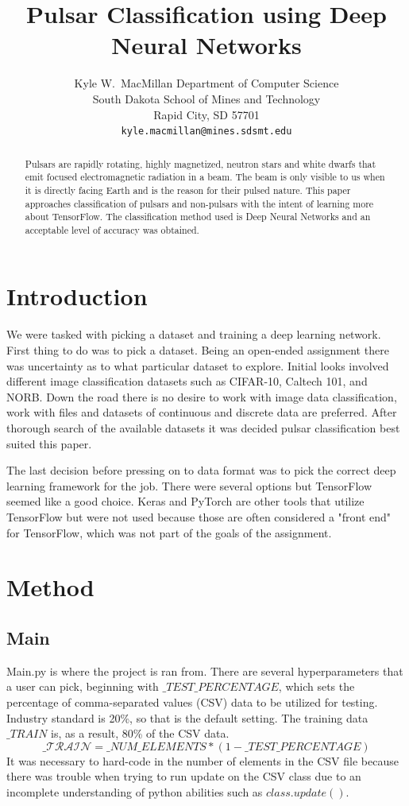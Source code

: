 \documentclass{article}
\title{Pulsar Classification using Deep Neural Networks}
\author{
  Kyle W.~MacMillan
  Department of Computer Science\\
  South Dakota School of Mines and Technology\\
  Rapid City, SD 57701 \\
  \texttt{kyle.macmillan@mines.sdsmt.edu} \\
}
\begin{document}
\maketitle

\begin{abstract}
  Pulsars are rapidly rotating, highly magnetized, neutron stars and white 
  dwarfs that emit focused electromagnetic radiation in a beam. The beam is 
  only visible to us when it is directly facing Earth and is the reason for 
  their pulsed nature. This paper approaches classification of pulsars and 
  non-pulsars with the intent of learning more about TensorFlow. The 
  classification method used is Deep Neural Networks and an acceptable level of 
  accuracy was obtained.
\end{abstract}

\section{Introduction}
  We were tasked with picking a dataset and training a deep learning network. 
  First thing to do was to pick a dataset. Being an open-ended assignment there 
  was uncertainty as to what particular dataset to explore. Initial looks 
  involved different image classification datasets such as CIFAR-10, 
  Caltech 101, and NORB. Down the road there is no desire to work with image 
  data classification, work with files and datasets of continuous and 
  discrete data are preferred. After thorough search of the available datasets 
  it was decided pulsar classification best suited this paper. 

  The last decision before pressing on to data format was to pick the correct 
  deep learning framework for the job. There were several options but 
  TensorFlow seemed like a good choice. Keras and PyTorch are other tools that 
  utilize TensorFlow but were not used because those are often considered a 
  "front end" for TensorFlow, which was not part of the goals of the 
  assignment.

\section{Method}

\subsection{Main}
  Main.py is where the project is ran from. There are several hyperparameters 
  that a user can pick, beginning with $\_TEST\_PERCENTAGE$, which sets the 
  percentage of comma-separated values (CSV) data to be utilized for testing. 
  Industry standard is 20\%, so that is the default setting. The training data 
  $\_TRAIN$ is, as a result, 80\% of the CSV data. 
  \[\mathcal{\_TRAIN}=\_NUM\_ELEMENTS * ( 1 - \_TEST\_PERCENTAGE )\]
  It was necessary to hard-code in the number of elements in the CSV file because there was trouble when trying to run update on the CSV class due to 
  an incomplete understanding of python abilities such as $class.update()$.
\end{document}
